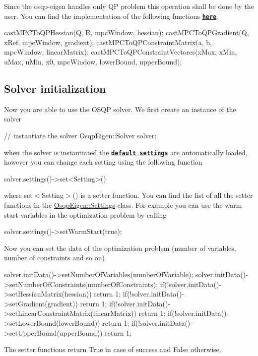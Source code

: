 Since the osqp-\/eigen handles only QP problem this operation shall be done by the user. You can find the implementation of the following functions \href{https://github.com/GiulioRomualdi/osqp-eigen/blob/master/example/src/MPCExample.cpp#L71-L182}{\tt {\bfseries here}}. 
\begin{DoxyCode}
castMPCToQPHessian(Q, R, mpcWindow, hessian);
castMPCToQPGradient(Q, xRef, mpcWindow, gradient);
castMPCToQPConstraintMatrix(a, b, mpcWindow, linearMatrix);
castMPCToQPConstraintVectores(xMax, xMin, uMax, uMin, x0, mpcWindow, lowerBound, upperBound);
\end{DoxyCode}
\hypertarget{index_OSQP_init}{}\subsection{Solver initialization}\label{index_OSQP_init}
Now you are able to use the O\+S\+QP solver. We first create an instance of the solver 
\begin{DoxyCode}
\textcolor{comment}{// instantiate the solver}
OsqpEigen::Solver solver;
\end{DoxyCode}
 when the solver is instantiated the \href{http://osqp.readthedocs.io/en/latest/interfaces/solver_settings.html}{\tt {\bfseries default settings}} are automatically loaded, however you can change each setting using the following function 
\begin{DoxyCode}
solver.settings()->set<Setting>()
\end{DoxyCode}
 where {\ttfamily set$<$\+Setting$>$()} is a setter function. You can find the list of all the setter functions in the {\ttfamily \hyperlink{classOsqpEigen_1_1Settings}{Osqp\+Eigen\+::\+Settings}} class. For example you can use the warm start variables in the optimization problem by calling 
\begin{DoxyCode}
solver.settings()->setWarmStart(\textcolor{keyword}{true});
\end{DoxyCode}


Now you can set the data of the optimization problem (number of variables, number of constraints and so on) 
\begin{DoxyCode}
solver.initData()->setNumberOfVariables(numberOfVariable);
solver.initData()->setNumberOfConstraints(numberOfConstraints);
\textcolor{keywordflow}{if}(!solver.initData()->setHessianMatrix(hessian)) \textcolor{keywordflow}{return} 1;
\textcolor{keywordflow}{if}(!solver.initData()->setGradient(gradient)) \textcolor{keywordflow}{return} 1;
\textcolor{keywordflow}{if}(!solver.initData()->setLinearConstraintMatrix(linearMatrix)) \textcolor{keywordflow}{return} 1;
\textcolor{keywordflow}{if}(!solver.initData()->setLowerBound(lowerBound)) \textcolor{keywordflow}{return} 1;
\textcolor{keywordflow}{if}(!solver.initData()->setUpperBound(upperBound)) \textcolor{keywordflow}{return} 1;
\end{DoxyCode}
 The setter functions return {\ttfamily True} in case of success and {\ttfamily False} otherwise.

